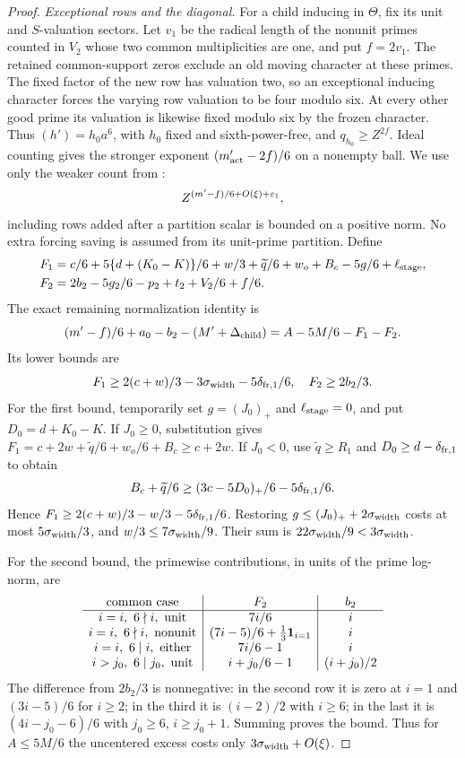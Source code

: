 \begin{proof}
\emph{Exceptional rows and the diagonal.}
For a child inducing in $\Theta$, fix its unit and $S$-valuation sectors. Let $v_1$ be the radical length of the nonunit primes counted in $V_2$ whose two common multiplicities are one, and put $f=2v_1$. The retained common-support zeros exclude an old moving character at these primes. The fixed factor of the new row has valuation two, so an exceptional inducing character forces the varying row valuation to be four modulo six. At every other good prime its valuation is likewise fixed modulo six by the frozen character. Thus $(h')=h_0a^6$, with $h_0$ fixed and sixth-power-free, and $q_{h_0}\ge Z^{2f}$. Ideal counting gives the stronger exponent $(m'_{\rm act}-2f)/6$ on a nonempty ball. We use only the weaker count from :
\[
 Z^{(m'-f)/6+O(\xi)+\varepsilon_1},
\]
including rows added after a partition scalar is bounded on a positive norm. No extra forcing saving is assumed from its unit-prime partition. Define
\begin{align*}
 F_1&=c/6+5\{d+(K_0-K)\}/6+w/3+\widetilde q/6+w_o+B_c
                       -5g/6+\ell_{\rm stage},\\
 F_2&=2b_2-5g_2/6-p_2+t_2+V_2/6+f/6.
\end{align*}
The exact remaining normalization identity is
\[
 (m'-f)/6+a_0-b_2-(M'+\Delta_{\rm child})
       =A-5M/6-F_1-F_2.
\]
Its lower bounds are
\[
 F_1\ge2(c+w)/3-3\sigma_{\rm width}-5\delta_{{\rm fr},1}/6,\quad
 F_2\ge2b_2/3.
\]
For the first bound, temporarily set $g=(J_0)_+$ and $\ell_{\rm stage}=0$, and put $D_0=d+K_0-K$. If $J_0\ge0$, substitution gives
$F_1=c+2w+\widetilde q/6+w_o/6+B_c\ge c+2w$.
If $J_0<0$, use $\widetilde q\ge R_1$ and $D_0\ge d-\delta_{{\rm fr},1}$ to obtain
\[
 B_c+\widetilde q/6\ge(3c-5D_0)_+/6-5\delta_{{\rm fr},1}/6.
\]
Hence $F_1\ge2(c+w)/3-w/3-5\delta_{{\rm fr},1}/6$. Restoring $g\le(J_0)_++2\sigma_{\rm width}$ costs at most $5\sigma_{\rm width}/3$, and $w/3\le7\sigma_{\rm width}/9$. Their sum is $22\sigma_{\rm width}/9<3\sigma_{\rm width}$.

For the second bound, the primewise contributions, in units of the prime log-norm, are
\[
\begin{array}{c|c|c}
\text{common case}&F_2&b_2\\ \hline
i=i,\ 6\nmid i,\ \text{unit}&7i/6&i\\
i=i,\ 6\nmid i,\ \text{nonunit}&(7i-5)/6+\frac13\mathbf 1_{i=1}&i\\
i=i,\ 6\mid i,\ \text{either}&7i/6-1&i\\
i>j_0,\ 6\mid j_0,\ \text{unit}&i+j_0/6-1&(i+j_0)/2
\end{array}
\]
The difference from $2b_2/3$ is nonnegative: in the second row it is zero at $i=1$ and $(3i-5)/6$ for $i\ge2$; in the third it is $(i-2)/2$ with $i\ge6$; in the last it is $(4i-j_0-6)/6$ with $j_0\ge6$, $i\ge j_0+1$. Summing proves the bound. Thus for $A\le5M/6$ the uncentered excess costs only $3\sigma_{\rm width}+O(\xi)$.


\end{proof}
